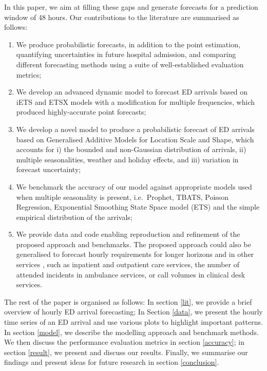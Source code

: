 \documentclass[]{elsarticle} %
\begin{document}
In this paper, we aim at filling these gaps and generate forecasts for a prediction window of 48 hours. Our contributions to the literature are summarised as follows:

\begin{enumerate}
\def\labelenumi{\arabic{enumi}.}
\item
  We produce probabilistic forecasts, in addition to the point
  estimation, quantifying uncertainties in future hospital admission,
  and comparing different forecasting methods using a suite of
  well-established evaluation metrics;
\item
  We develop an advanced dynamic model to forecast ED arrivals based
  on iETS \citep{Svetunkov2019a} and ETSX models with a modification for
  multiple frequencies, which produced highly-accurate point
  forecasts;
\item
  We develop a novel model to produce a probabilistic forecast of ED
  arrivals based on Generalised Additive Models for Location Scale and
  Shape, which accounts for i) the bounded and non-Gaussian
  distribution of arrivals, ii) multiple seasonalities, weather and
  holiday effects, and iii) variation in forecast uncertainty;
\item
  We benchmark the accuracy of our model against appropriate models
  used when multiple seasonality is present, i.e.~Prophet, TBATS,
  Poisson Regression, Exponential Smoothing State Space model (ETS)
  and the simple empirical distribution of the arrivals;
\item
  We provide data and code enabling reproduction and refinement of the
  proposed approach and benchmarks. The proposed approach could also
  be generalised to forecast hourly requirements for longer horizons
  and in other services \citep{al2021empirical}, such as inpatient and
  outpatient care services, the number of attended incidents in
  ambulance services, or call volumes in clinical desk services.
\end{enumerate}

The rest of the paper is organised as follows: In section \ref{lit}, we
provide a brief overview of hourly ED arrival forecasting; In Section
\ref{data}, we present the hourly time series of an ED arrival and use
various plots to highlight important patterns. In section \ref{model},
we describe the modelling approach and benchmark methods. We then
discuss the performance evaluation metrics in section \ref{accuracy};
in section \ref{result}, we present and discuss our results. Finally,
we summarise our findings and present ideas for future research in
section \ref{conclusion}.
\end{document}
